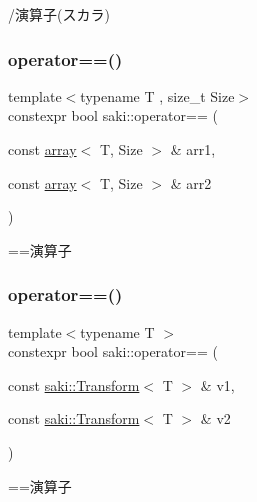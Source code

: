 /演算子(スカラ) 

\mbox{\label{namespacesaki_a5ce8a66ed6ece15fa9ddeaec2746374d}} 
\subsubsection{\texorpdfstring{operator==()}{operator==()}\hspace{0.1cm}{\footnotesize\ttfamily [1/11]}}
{\footnotesize\ttfamily template$<$typename T , size\+\_\+t Size$>$ \\
constexpr bool saki\+::operator== (\begin{DoxyParamCaption}\item[{const \mbox{\hyperlink{classsaki_1_1array}{array}}$<$ T, Size $>$ \&}]{arr1,  }\item[{const \mbox{\hyperlink{classsaki_1_1array}{array}}$<$ T, Size $>$ \&}]{arr2 }\end{DoxyParamCaption})}



==演算子 

\mbox{\label{namespacesaki_ac56eb811c4d74d9b697f061b08d9f0c6}} 
\subsubsection{\texorpdfstring{operator==()}{operator==()}\hspace{0.1cm}{\footnotesize\ttfamily [2/11]}}
{\footnotesize\ttfamily template$<$typename T $>$ \\
constexpr bool saki\+::operator== (\begin{DoxyParamCaption}\item[{const \mbox{\hyperlink{classsaki_1_1_transform}{saki\+::\+Transform}}$<$ T $>$ \&}]{v1,  }\item[{const \mbox{\hyperlink{classsaki_1_1_transform}{saki\+::\+Transform}}$<$ T $>$ \&}]{v2 }\end{DoxyParamCaption})}



==演算子 

\mbox{\label{namespacesaki_a2caa00a8041e5dd4da3baf2e2575a980}} 
